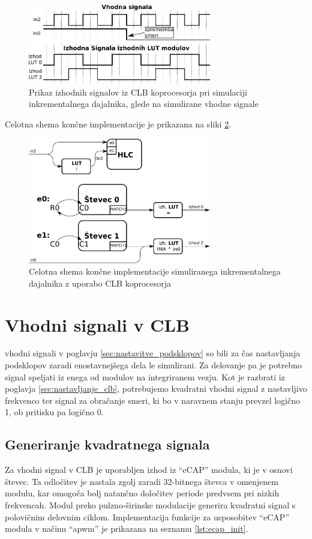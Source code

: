 \documentclass[a4paper]{article}
\begin{document}
\begin{sloppypar}
\begin{figure}[htb]
    \centerline{\includegraphics[width=8cm]{obracanje_smeri_potek}}
    \caption{Prikaz izhodnih signalov iz CLB koprocesorja pri simulaciji 
             inkrementalnega dajalnika, glede na simulirane vhodne signale}
    \label{fig:obracanje_smeri}
\end{figure}

Celotna shema končne implementacije je prikazana na sliki
\ref{fig:koncna_shema}.

\begin{figure}[htb]
    \centerline{\includegraphics[width=8cm]{koncna_shema}}
    \caption{Celotna shema končne implementacije simuliranega inkrementalnega
             dajalnika z uporabo CLB koprocesorja}
    \label{fig:koncna_shema}
\end{figure}

\section{Vhodni signali v CLB}
vhodni signali v poglavju \ref{sec:nastavitve_podsklopov} so bili za čas
nastavljanja podsklopov zaradi enostavnejšega dela le simulirani. Za delovanje
pa je potrebno signal speljati iz enega od modulov na integriranem vezju. Kot
je razbrati iz poglavja \ref{sec:nastavljanje_clb}, potrebujemo kvadratni
vhodni signal z nastavljivo frekvenco ter signal za obračanje smeri, ki bo v
naravnem stanju prevzel logično 1, ob pritisku pa logično 0.

\subsection{Generiranje kvadratnega signala}
Za vhodni signal v CLB je uporabljen izhod iz ``eCAP'' modula, ki je v osnovi
števec. Ta odločitev je nastala zgolj zaradi 32-bitnega števca v omenjenem
modulu, kar omogoča bolj natančno določitev periode predvsem pri nizkih frekvencah. Modul preko
pulzno-širinske modulacije generira kvadratni signal s polovičnim delovnim
ciklom. Implementacija funkcije za usposobitev ``eCAP'' modula v načinu
``apwm'' je prikazana na seznamu \ref{lst:ecap_init}.


\end{sloppypar}
\end{document}
